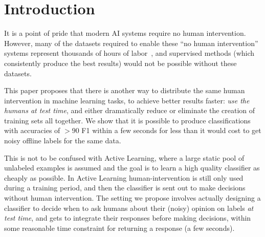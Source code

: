 
\section{Introduction}



It is a point of pride that modern AI systems require no human intervention.
However, many of the datasets required to enable these ``no human intervention'' systems represent thousands of hours of labor~\cite{AMR}\cite{ImageNET}, and supervised methods (which consistently produce the best results) would not be possible without these datasets.

This paper proposes that there is another way to distribute the same human intervention in machine learning tasks, to achieve better results faster: {\em use the humans at test time}, and either dramatically reduce or eliminate the creation of training sets all together. We show that it is possible to produce classifications with accuracies of $> 90$ F1 within a few seconds for less than it would cost to get noisy offline labels for the same data.

This is not to be confused with Active Learning, where a large static pool of unlabeled examples is assumed and the goal is to learn a high quality classifier as cheaply as possible. In Active Learning human-intervention is still only used during a training period, and then the classifier is sent out to make decisions without human intervention. The setting we propose involves actually designing a classifier to decide when to ask humans about their (noisy) opinion on labels {\em at test time}, and gets to integrate their responses before making decisions, within some reasonable time constraint for returning a response (a few seconds).

